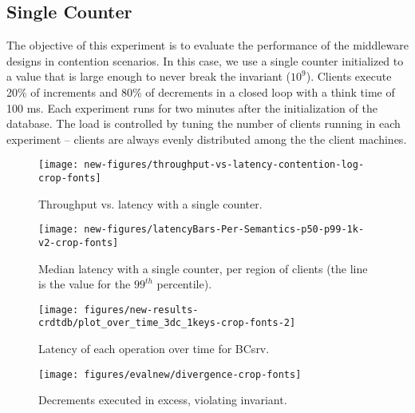 \documentclass[conference]{IEEEtran}
\begin{document}
\subsection{Single Counter}
\label{sec:single_counter}

The objective of this experiment is to evaluate the performance of the middleware 
designs in contention scenarios.
In this case, we use a single counter initialized to a value that is large enough to
never break the invariant ($10^9$). Clients execute 20\% of increments and 80\% of decrements 
in a closed loop with a think time of 100 ms. Each experiment runs for two minutes 
after the initialization of the database.
The load is controlled by tuning the number of clients running in each 
experiment -- clients are always evenly distributed among the the client machines.
 
\begin{figure}[t]\centering
\texttt{[image: new-figures/throughput-vs-latency-contention-log-crop-fonts]}
\vspace{-1ex}
\caption{Throughput vs. latency with a single counter.}
\label{fig:single:throughput}
\end{figure}




\begin{figure*}[t]
\centering
\begin{minipage}{.29\textwidth}
\texttt{[image: new-figures/latencyBars-Per-Semantics-p50-p99-1k-v2-crop-fonts]}
\caption{Median latency with a single counter, per region of clients (the line is the value for the $99^{th}$ percentile).}
\label{fig:single:latencybar}
\end{minipage}\hspace{0.04\textwidth}
\begin{minipage}{.29\textwidth}
\texttt{[image: figures/new-results-crdtdb/plot\_over\_time\_3dc\_1keys-crop-fonts-2]}
\caption{Latency of each operation over time for BCsrv.}
\label{fig:single:latOvertime}
\end{minipage}\hspace{0.04\textwidth}
\begin{minipage}{.29\textwidth}
\texttt{[image: figures/evalnew/divergence-crop-fonts]}
\caption{Decrements executed in excess, violating invariant.}
\label{fig:single:excess}
\end{minipage}\end{figure*}
\end{document}
